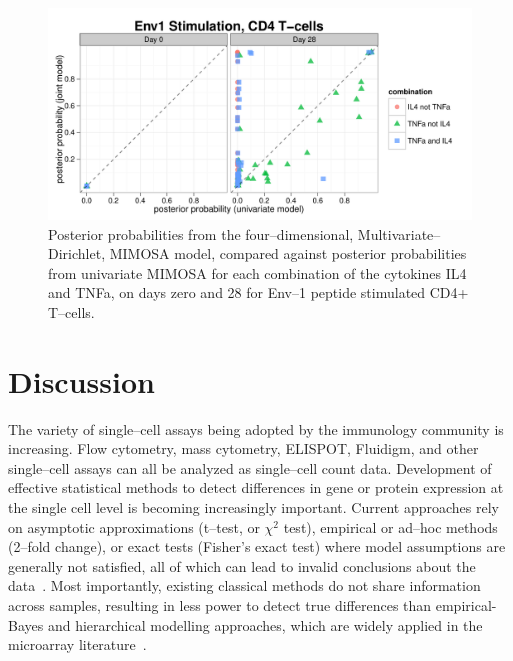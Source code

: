 \documentclass[11pt]{article}
\begin{document}
\begin{figure}[htbp] %
   \centering
   \includegraphics[width=6in]{Figures/Polyfunctionality_Env1} 
   \caption{Posterior probabilities from the four--dimensional, Multivariate--Dirichlet, MIMOSA model, compared against posterior probabilities from univariate MIMOSA for each combination of the cytokines IL4 and TNFa, on days zero and 28 for Env--1 peptide stimulated CD4+ T--cells.}
   \label{fig:polyfunctionalityenv1}
\end{figure}

\section*{Discussion}
The variety of single--cell assays being adopted by the immunology community is increasing. Flow cytometry, mass cytometry, ELISPOT, Fluidigm, and other single--cell assays can all be analyzed as single--cell count data. Development of effective statistical methods to detect differences in gene or protein expression at the single cell level is becoming increasingly important. Current approaches rely on asymptotic approximations (t--test, or $\chi^2$ test), empirical or ad--hoc methods (2--fold change), or exact tests (Fisher's exact test) where model assumptions are generally not satisfied, all of which can lead to invalid conclusions about the data~\cite{Dittrich:2012bv,Trigona:2003,Sinclair:2004hs,Horton:2007tsa,Proschan:2009ks}. Most importantly, existing classical methods do not share information across samples, resulting in less power to detect true differences than empirical-Bayes and hierarchical modelling approaches, which are widely applied in the microarray literature~\cite{Kendziorski:2003uw,Newton:2001go,Smyth:2005iy}. 
\end{document}
